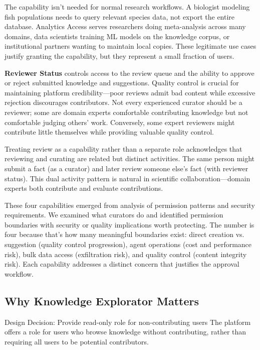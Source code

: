 \documentclass[12pt,a4paper]{article}
\begin{document}
The capability isn't needed for normal research workflows. A biologist modeling fish populations needs to query relevant species data, not export the entire database. Analytics Access serves researchers doing meta-analysis across many domains, data scientists training ML models on the knowledge corpus, or institutional partners wanting to maintain local copies. These legitimate use cases justify granting the capability, but they represent a small fraction of users.

\textbf{Reviewer Status} controls access to the review queue and the ability to approve or reject submitted knowledge and suggestions. Quality control is crucial for maintaining platform credibility—poor reviews admit bad content while excessive rejection discourages contributors. Not every experienced curator should be a reviewer; some are domain experts comfortable contributing knowledge but not comfortable judging others' work. Conversely, some expert reviewers might contribute little themselves while providing valuable quality control.

Treating review as a capability rather than a separate role acknowledges that reviewing and curating are related but distinct activities. The same person might submit a fact (as a curator) and later review someone else's fact (with reviewer status). This dual activity pattern is natural in scientific collaboration—domain experts both contribute and evaluate contributions.

These four capabilities emerged from analysis of permission patterns and security requirements. We examined what curators do and identified permission boundaries with security or quality implications worth protecting. The number is four because that's how many meaningful boundaries exist: direct creation vs. suggestion (quality control progression), agent operations (cost and performance risk), bulk data access (exfiltration risk), and quality control (content integrity risk). Each capability addresses a distinct concern that justifies the approval workflow.

\subsection{Why Knowledge Explorator Matters}

\begin{rationale}{Design Decision: Provide read-only role for non-contributing users}
The platform offers a role for users who browse knowledge without contributing, rather than requiring all users to be potential contributors.
\end{rationale}
\end{document}
